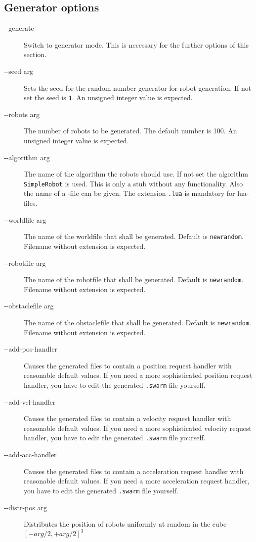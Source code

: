 \documentclass[a4paper,halfparskip,11pt,twoside]{scrartcl}
\begin{document}
\subsection{Generator options}
\begin{description}
	\item [-{}-generate] Switch to generator mode. This is necessary for the further options of this section.
	\item [-{}-seed arg] Sets the seed for the random number generator for robot generation. If not set the seed is {\tt 1}. An unsigned integer value is expected.
	\item [-{}-robots arg] The number of robots to be generated. The default number is 100. An unsigned integer value is expected.
	\item [-{}-algorithm arg] The name of the algorithm the robots should use. If not set the algorithm {\tt SimpleRobot} is used. This is only a stub without any functionality. Also the name of a \Lua-file can be given. The extension {\tt .lua} is mandatory for lua-files.
	\item [-{}-worldfile arg] The name of the worldfile that shall be generated. Default is {\tt newrandom}. Filename without extension is expected.
	\item [-{}-robotfile arg] The name of the robotfile that shall be generated. Default is {\tt newrandom}. Filename without extension is expected.
	\item [-{}-obstaclefile arg] The name of the obstaclefile that shall be generated. Default is {\tt newrandom}. Filename without extension is expected.
	\item [-{}-add-pos-handler] Causes the generated files to contain a position request handler with reasonable default values. If you need a more sophisticated position request handler, you have to edit the generated {\tt .swarm} file yourself.
	\item [-{}-add-vel-handler] Causes the generated files to contain a velocity request handler with reasonable default values. If you need a more sophisticated velocity request handler, you have to edit the generated {\tt .swarm} file yourself.
	\item [-{}-add-acc-handler] Causes the generated files to contain a acceleration request handler with reasonable default values. If you need a more acceleration request handler, you have to edit the generated {\tt .swarm} file yourself.
	\item [-{}-distr-pos arg] Distributes the position of robots uniformly at random in the cube $[-arg/2,+arg/2]^3$

\end{description}
\end{document}
